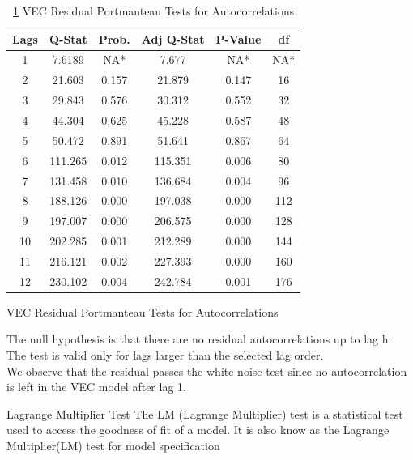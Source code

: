 \documentclass{beamer}
\begin{document}
	\begin{frame}
		
		\begin{table}
			\caption{ \ref{table:residual_port_test} VEC Residual Portmanteau Tests for Autocorrelations}
			\label{table:residual_port_test}
			\begin{tabular}{cccccc}
				\toprule
				Lags & Q-Stat & Prob. & Adj Q-Stat & P-Value & df \\
				\midrule
				
				1 & 7.6189 & NA* & 7.677 & NA* & NA* \\ [5pt]
				2 &21.603 & 0.157 & 21.879 & 0.147 & 16 \\
				3 & 29.843 & 0.576 & 30.312 & 0.552 & 32 \\
				4 & 44.304 & 0.625 & 45.228 & 0.587 & 48 \\
				5 & 50.472 & 0.891 & 51.641 & 0.867 & 64 \\
				6 & 111.265 & 0.012 & 115.351 & 0.006 & 80 \\
				7 & 131.458 & 0.010 & 136.684 & 0.004 & 96 \\
				8 & 188.126 & 0.000 & 197.038 & 0.000 & 112 \\
				9 & 197.007 & 0.000 & 206.575 & 0.000 & 128 \\
				10 & 202.285 & 0.001 & 212.289 & 0.000 & 144 \\
				11 & 216.121 & 0.002 & 227.393 & 0.000 & 160 \\
				12 & 230.102 & 0.004 & 242.784 & 0.001 & 176 \\
				
				\bottomrule
			\end{tabular}
		\end{table}
	\end{frame}
	\begin{frame}{VEC Residual Portmanteau Tests for Autocorrelations}
		\begin{block}{}
			The null hypothesis is that there are no residual autocorrelations up to lag h. The test is valid only for lags larger than the selected lag order. \\
			We observe that the residual passes the white noise test since no autocorrelation is left in the VEC model after lag 1.
		\end{block}
	
		\begin{block}{Lagrange Multiplier Test}
			The LM (Lagrange Multiplier) test is a statistical test used to access the goodness of fit of a model. It is also know as the Lagrange Multiplier(LM) test for model specification
		\end{block}
	\end{frame}
	
\end{document}
